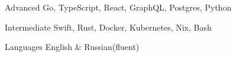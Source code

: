 
\begin{cvskills}

  \cvskill
    {Advanced}
    {Go, TypeScript, React, GraphQL, Postgres, Python}

    \cvskill
    {Intermediate}
    {Swift, Rust, Docker, Kubernetes, Nix, Bash}

  \cvskill
    {Languages}
    {English \& Russian(fluent)}

\end{cvskills}
